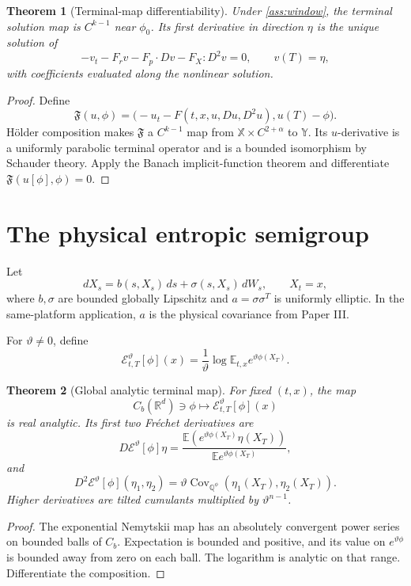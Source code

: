 \documentclass[11pt,reqno]{amsart}
\newtheorem{theorem}{Theorem}[section]
\theoremstyle{definition}
\theoremstyle{remark}
\newcommand{\E}{\mathbb E}
\newcommand{\Qp}{\mathbb Q}
\newcommand{\R}{\mathbb R}
\newcommand{\cE}{\mathcal E}
\newcommand{\Cov}{\operatorname{Cov}}
\begin{document}
\begin{theorem}[Terminal-map differentiability]\label{thm:ift}
Under \cref{ass:window}, the terminal solution map is $C^{k-1}$ near
$\phi_0$.  Its first derivative in direction $\eta$ is the unique solution of
\[
 -v_t-F_rv-F_p\cdot Dv-F_X:D^2v=0,\qquad v(T)=\eta,
\]
with coefficients evaluated along the nonlinear solution.
\end{theorem}

\begin{proof}
Define
\[
 \mathfrak F(u,\phi)
 =
 \bigl(-u_t-F(t,x,u,Du,D^2u),u(T)-\phi\bigr).
\]
H\"older composition makes $\mathfrak F$ a $C^{k-1}$ map from
$\mathbb X\times C^{2+\alpha}$ to $\mathbb Y$.  Its $u$-derivative is a
uniformly parabolic terminal operator and is a bounded isomorphism by Schauder
theory.  Apply the Banach implicit-function theorem and differentiate
$\mathfrak F(u[\phi],\phi)=0$.
\end{proof}

\section{The physical entropic semigroup}\label{sec:entropic}

Let
\[
 dX_s=b(s,X_s)\,ds+\sigma(s,X_s)\,dW_s,\qquad X_t=x,
\]
where $b,\sigma$ are bounded globally Lipschitz and
$a=\sigma\sigma^T$ is uniformly elliptic.  In the same-platform application,
$a$ is the physical covariance from Paper III.

For $\vartheta\ne0$, define
\begin{equation}\label{eq:theta}
 \cE_{t,T}^{\vartheta}[\phi](x)
 =
 \frac1\vartheta
 \log \E_{t,x}e^{\vartheta\phi(X_T)}.
\end{equation}

\begin{theorem}[Global analytic terminal map]\label{thm:analytic}
For fixed $(t,x)$, the map
\[
 C_b(\R^d)\ni\phi\longmapsto
 \cE_{t,T}^{\vartheta}[\phi](x)
\]
is real analytic.  Its first two Fr\'echet derivatives are
\[
 D\cE^\vartheta[\phi]\eta
 =
 \frac{\E(e^{\vartheta\phi(X_T)}\eta(X_T))}
 {\E e^{\vartheta\phi(X_T)}},
\]
and
\[
 D^2\cE^\vartheta[\phi](\eta_1,\eta_2)
 =
 \vartheta\Cov_{\Qp^\phi}
 (\eta_1(X_T),\eta_2(X_T)).
\]
Higher derivatives are tilted cumulants multiplied by
$\vartheta^{n-1}$.
\end{theorem}

\begin{proof}
The exponential Nemytskii map has an absolutely convergent power series on
bounded balls of $C_b$.  Expectation is bounded and positive, and its value on
$e^{\vartheta\phi}$ is bounded away from zero on each ball.  The logarithm is
analytic on that range.  Differentiate the composition.
\end{proof}
\end{document}

